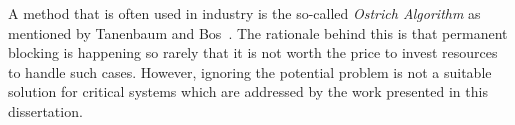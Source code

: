 A method that is often used in industry is the so-called \emph{Ostrich Algorithm} as mentioned by Tanenbaum and Bos~\cite{tanenbaum2014}.
The rationale behind this is that permanent blocking is happening so rarely that it is not worth the price to invest resources to handle such cases.
However, ignoring the potential problem is not a suitable solution for critical systems which are addressed by the work presented in this dissertation.
